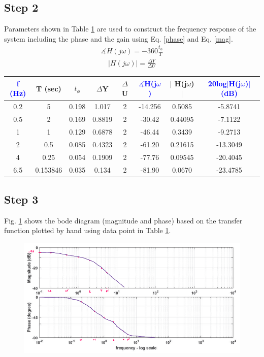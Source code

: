 \documentclass[hidelinks]{article}
\begin{document}
	\subsection{Step 2}
	Parameters shown in Table \ref{t2} are used to construct the frequency response of the system including the phase and the gain using Eq. \ref{phase} and Eq. \ref{mag}.
	\begin{align}
		\label{phase}
		\measuredangle H(j\omega) = -360 \frac{t_{\phi}}{T}
	\end{align}
	\begin{align}
		\label{mag}
		\mid H(j\omega)\mid = \frac{\Delta Y}{\Delta U}
	\end{align}
	\begin{table}[htbp]
		\centering
		\begin{tabular}{|c|c|c|c|c|c|c|c|}
			\hline
			\textcolor{blue}{f (Hz)} & T (sec) & $t_\phi$ & $\Delta$Y & $\Delta$U & \textcolor{blue}{$\measuredangle$H(j$\omega$)} & $\mid$ H(j$\omega$)$\mid$ & \textcolor{blue}{20log$\mid$H(j$\omega$)$\mid$ (dB)}\\
			\hline\hline
			0.2 & 5 & 0.198 & 1.017 & 2 & -14.256 & 0.5085 & -5.8741\\
			\hline
			0.5 & 2 & 0.169 & 0.8819 & 2 & -30.42 & 0.44095 & -7.1122\\
			\hline
			1 & 1 & 0.129 & 0.6878 & 2 & -46.44 & 0.3439 & -9.2713\\ 
			\hline 
			2 & 0.5 & 0.085 & 0.4323 & 2 & -61.20 & 0.21615 & -13.3049\\
			\hline
			4 & 0.25 & 0.054 & 0.1909 & 2 & -77.76 & 0.09545 & -20.4045\\
			\hline
			6.5 & 0.153846 & 0.035 & 0.134 & 2 & -81.90 & 0.0670 & -23.4785\\
			\hline
		\end{tabular}
		\label{t2}
	\end{table}
	\subsection{Step 3}
	Fig. \ref{f44} shows the bode diagram (magnitude and phase) based on the transfer function plotted by hand using data point in Table \ref{t2}.
	\begin{figure}[htbp]
		\centering
		\includegraphics[width=0.7\textheight]{bodeHand.png}
		\label{f44}
	\end{figure}
	
\end{document}
